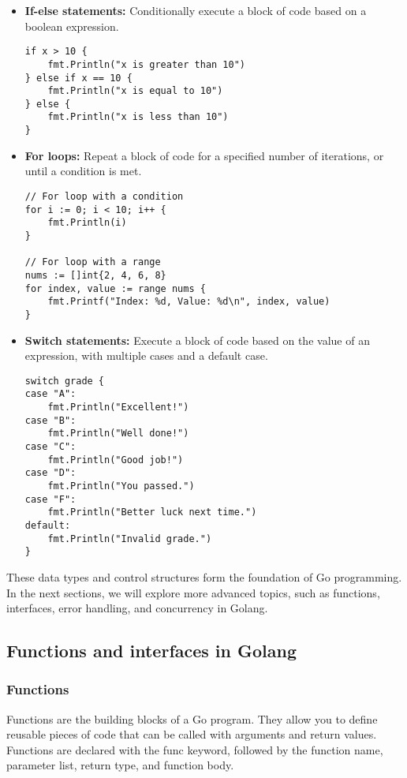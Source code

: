 \documentclass{article}
\begin{document}
\begin{itemize}
\item \textbf{If-else statements:} Conditionally execute a block of code based on a boolean expression.
\begin{verbatim}
if x > 10 {
    fmt.Println("x is greater than 10")
} else if x == 10 {
    fmt.Println("x is equal to 10")
} else {
    fmt.Println("x is less than 10")
}
\end{verbatim}

\item \textbf{For loops:} Repeat a block of code for a specified number of iterations, or until a condition is met.

\begin{verbatim}
// For loop with a condition
for i := 0; i < 10; i++ {
    fmt.Println(i)
}

// For loop with a range
nums := []int{2, 4, 6, 8}
for index, value := range nums {
    fmt.Printf("Index: %d, Value: %d\n", index, value)
}
\end{verbatim}

\item \textbf{Switch statements:} Execute a block of code based on the value of an expression, with multiple cases and a default case.

\begin{verbatim}
switch grade {
case "A":
    fmt.Println("Excellent!")
case "B":
    fmt.Println("Well done!")
case "C":
    fmt.Println("Good job!")
case "D":
    fmt.Println("You passed.")
case "F":
    fmt.Println("Better luck next time.")
default:
    fmt.Println("Invalid grade.")
}
\end{verbatim}
\end{itemize}

These data types and control structures form the foundation of Go programming. In the next sections, we will explore more advanced topics, such as functions, interfaces, error handling, and concurrency in Golang.


\subsection{Functions and interfaces in Golang}
\subsubsection{Functions}

Functions are the building blocks of a Go program. They allow you to define reusable pieces of code that can be called with arguments and return values. Functions are declared with the func keyword, followed by the function name, parameter list, return type, and function body.
\end{document}
